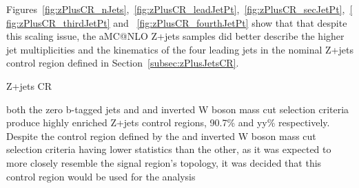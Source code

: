 Figures~\ref{fig:zPlusCR_nJets},~\ref{fig:zPlusCR_leadJetPt},~\ref{fig:zPlusCR_secJetPt},~\ref{fig:zPlusCR_thirdJetPt} and ~\ref{fig:zPlusCR_fourthJetPt} show that that despite this scaling issue, the aMC@NLO Z+jets samples did better describe the higher jet multiplicities and the kinematics of the four leading jets in the nominal Z+jets control region defined in Section~\ref{subsec:zPlusJetsCR}.

Z+jets CR

both the zero b-tagged jets and \MET and inverted W boson mass cut selection criteria produce highly enriched Z+jets control regions, 90.7\% and yy\% respectively.
Despite the control region defined by the \MET and inverted W boson mass cut selection criteria having lower statistics than the other, as it was expected to more closely resemble the signal region's topology, it was decided that this control region would be used for the analysis

